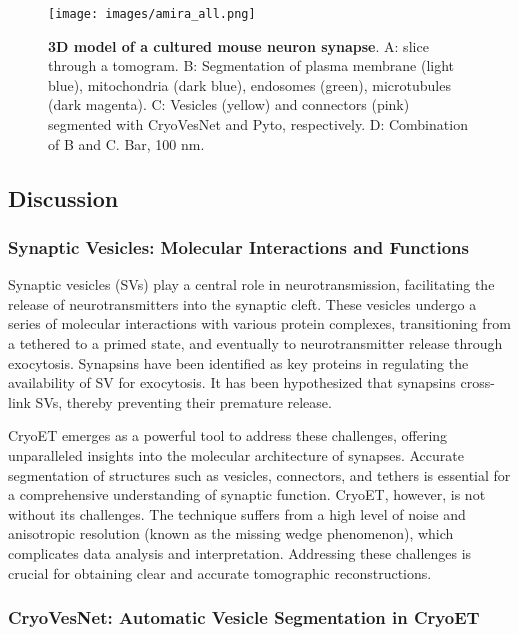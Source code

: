 \begin{figure}
\hypertarget{fig:amira}{%
\centering
\texttt{[image: images/amira\_all.png]}
\caption{\textbf{3D model of a cultured mouse neuron synapse}. A: slice through a tomogram. B: Segmentation of plasma membrane (light blue), mitochondria (dark blue), endosomes (green), microtubules (dark magenta). C: Vesicles (yellow) and connectors (pink) segmented with CryoVesNet and Pyto, respectively. D: Combination of B and C. Bar, 100 nm.}\label{fig:amira}
}
\end{figure}

\hypertarget{discussion}{%
\subsection{Discussion}\label{discussion}}

\hypertarget{synaptic-vesicles-molecular-interactions-and-functions}{%
\subsubsection{Synaptic Vesicles: Molecular Interactions and Functions}\label{synaptic-vesicles-molecular-interactions-and-functions}}

Synaptic vesicles (SVs) play a central role in neurotransmission, facilitating the release of neurotransmitters into the synaptic cleft.
These vesicles undergo a series of molecular interactions with various protein complexes, transitioning from a tethered to a primed state, and eventually to neurotransmitter release through exocytosis.
Synapsins have been identified as key proteins in regulating the availability of SV for exocytosis.
It has been hypothesized that synapsins cross-link SVs, thereby preventing their premature release.

CryoET emerges as a powerful tool to address these challenges, offering unparalleled insights into the molecular architecture of synapses.
Accurate segmentation of structures such as vesicles, connectors, and tethers is essential for a comprehensive understanding of synaptic function.
CryoET, however, is not without its challenges.
The technique suffers from a high level of noise and anisotropic resolution (known as the missing wedge phenomenon), which complicates data analysis and interpretation.
Addressing these challenges is crucial for obtaining clear and accurate tomographic reconstructions.

\hypertarget{cryovesnet-automatic-vesicle-segmentation-in-cryoet}{%
\subsubsection{CryoVesNet: Automatic Vesicle Segmentation in CryoET}\label{cryovesnet-automatic-vesicle-segmentation-in-cryoet}}

